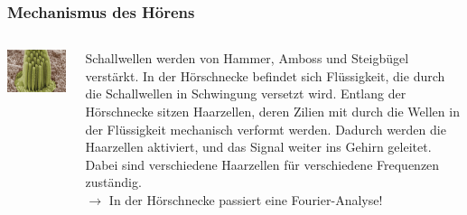 \documentclass{beamer}
\begin{document}
\begin{frame}
 \frametitle{Mechanismus des Hörens}

\begin{columns}[c]


\begin{column}{4cm}
\begin{center}
\includegraphics[width=\textwidth]{Stereocilia.jpg}
\end{center}
\end{column}

\pause

\begin{column}{7cm}
Schallwellen werden von Hammer, Amboss und Steigbügel verstärkt. In der Hörschnecke befindet sich Flüssigkeit, die durch die Schallwellen in Schwingung versetzt wird. Entlang der Hörschnecke sitzen Haarzellen, deren Zilien mit durch die Wellen in der Flüssigkeit mechanisch verformt werden. Dadurch werden die Haarzellen aktiviert, und das Signal weiter ins Gehirn geleitet. Dabei sind verschiedene Haarzellen für verschiedene Frequenzen zuständig.   \\
\pause
\textcolor{theme}{\(\rightarrow\) In der Hörschnecke passiert eine Fourier-Analyse!}
\end{column}

\end{columns}

\end{frame}
\end{document}
